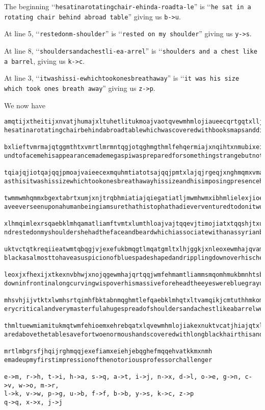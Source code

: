 The beginning
\lq\lq\texttt{hesatinarotatingchair-ehinda-roadta-le}''
is
\lq\lq\texttt{he sat in a rotating chair behind abroad table}''
giving us \verb!b->u!.

At line 5, \lq\lq\verb!restedonm-shoulder!'' is \lq\lq\verb!rested on my shoulder!''
giving us \verb!y->s!.

At line 8,
\lq\lq\texttt{shouldersandachestli-ea-arrel}''
is
\lq\lq\texttt{shoulders and a chest like a barrel},
giving us \verb!k->c!.

At line 3,
\lq\lq\texttt{itwashissi-ewhichtookonesbreathaway}'' is
\lq\lq\texttt{it was his size which took ones breath away}'' giving us \verb!z->p!.

We now have
  \begin{Verbatim}[frame=single,fontsize=\tiny]
amqtijxtheitijxnvatjhumajxltuhetlitukmoajvaotqvewmhmlojiaueecqrtgqtxlljtnhtrqtqjmximhmlajqqmtiqgbxhe
hesatinarotatingchairbehindabroadtablewhichwascoveredwithbooksmapsanddiagramsasienteredhisseatspunro

bxlieftvmrmajqtggmthtxvmrtlmrmntqgjotqghmgthmlfehqermiajxnqihtxnmubixeifehqeewmhgeomhjxntgmhqextkjis
undtofacemehisappearancemademegaspiwaspreparedforsomethingstrangebutnotforsooverpoweringapersonality

tqiajqjiotqajqqjpmoajvaieecexmquhmtiatotsajqqjpmtxlajqjrgeqjxnghmqmxvmajqamtlotqmxehrebqiamkthnmqija
asthisitwashissizewhichtookonesbreathawayhissizeandhisimposingpresencehisheadwasenormousthelargestih

twmmwmhqmmxbgextabrtxumjxnjtrqbhmiatiajqiegatiatljmwmhwmxibhmlielexjioebklatwmqkjggmlewmhrmmxijhmkst
aveeverseenuponahumanbeingiamsurethathistophathadieverventuredtodonitwouldhaveslippedovermeentirelya

xlhmqimlexrsqaebklmhqamatliamftvmtxlumthloajvajtqqevjtimojiatxtqqshjtxubkkiamfehrmhfkehjliamktiimhqe
ndrestedonmyshouldershehadthefaceandbeardwhichiassociatewithanassyrianbulltheformerfloridthelatterso

uktvctqtkreqiieatwmtqbqgjvjexefukbmqgtlmqatgmltxlhjggkjxnleoxewmhajqvamqiiamatjhotqgmvbkjthgktqimhml
blackasalmosttohaveasuspicionofbluespadeshapedandripplingdownoverhischestthehairwaspeculiarplastered

leoxjxfhexijxtkexnvbhwjxnojqgewmhajqrtqqjwmfehmamtliammsmqomhmukbmnhtsbxlmhnhmtiuktvcibfiqwmhsvkmthw
downinfrontinalongcurvingwispoverhismassiveforeheadtheeyeswerebluegrayundergreatblacktuftsveryclearv

mhsvhjijvtktxlwmhsrtqimhfbktabnmqghmtlefqaebklmhqtxltvamqikjcmtuthhmkomhmiameiamhgthiqefajroajvatggm
erycriticalandverymasterfulahugespreadofshouldersandachestlikeabarrelweretheotherpartsofhimwhichappe

thmltuewmiamitukmqtwmfehioemxehrebqatxlqvewmhmlojiakexnuktvcatjhiajqtxltumkkeojxnhethjxnhbrukjxnwejv
aredabovethetablesavefortwoenormoushandscoveredwithlongblackhairthisandabellowingroaringrumblingvoic

mrtlmbgrsfjhqijrghmqqjexefiamxeiehjebqghefmqqehvatkkmxnmh
emadeupmyfirstimpressionofthenotoriousprofessorchallenger

e->m, r->h, t->i, h->a, s->q, a->t, i->j, n->x, d->l, o->e, g->n, c->v, w->o, m->r,
l->k, v->w, p->g, u->b, f->f, b->b, y->s, k->c, z->p
q->q, x->x, j->j
\end{Verbatim}
